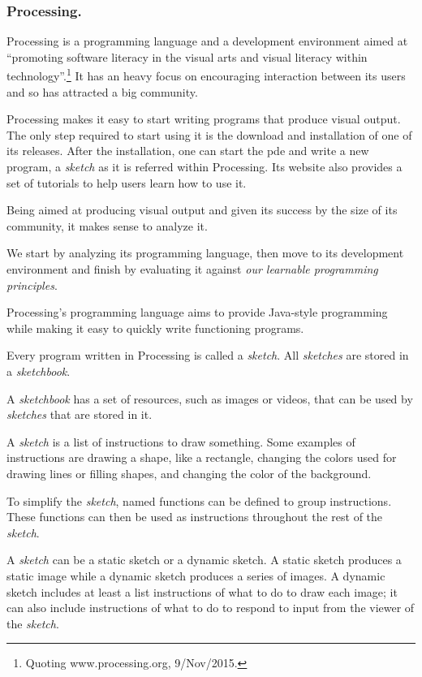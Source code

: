 \documentclass{./llncs2e/llncs}
\begin{document}
\subsubsection{Processing.}
	Processing\cite{reas2007processing} is a programming language and a development environment aimed at ``promoting software literacy in the visual arts and visual literacy within technology''.\footnote{Quoting www.processing.org, 9/Nov/2015.}
	It has an heavy focus on encouraging interaction between its users and so has attracted a big community.
	
	Processing makes it easy to start writing programs that produce visual output. 
	The only step required to start using it is the download and installation of one of its releases. 
	After the installation, one can start the \ac{pde} and write a new program, a \emph{sketch} as it is referred within Processing. 
	Its website also provides a set of tutorials to help users learn how to use it.
	
	Being aimed at producing visual output and given its success by the size of its community, it makes sense to analyze it.
	
	We start by analyzing its programming language, then move to its development environment and finish by evaluating it against \emph{our learnable programming principles}.
	
	Processing's programming language aims to provide Java-style programming while making it easy to quickly write functioning programs. 
	
	Every program written in Processing is called a \emph{sketch}. 
	All \emph{sketches} are stored in a \emph{sketchbook}.
	
	A \emph{sketchbook} has a set of resources, such as images or videos, that can be used by \emph{sketches} that are stored in it.
	
	A \emph{sketch} is a list of instructions to draw something. 
	Some examples of instructions are drawing a shape, like a rectangle, changing the colors used for drawing lines or filling shapes, and changing the color of the background.
	
	To simplify the \emph{sketch}, named functions can be defined to group instructions. 
	These functions can then be used as instructions throughout the rest of the \emph{sketch}.
	
	A \emph{sketch} can be a static sketch or a dynamic sketch. 
	A static sketch produces a static image while a dynamic sketch produces a series of images. 
	A dynamic sketch includes at least a list instructions of what to do to draw each image; it can also include instructions of what to do to respond to input from the viewer of the \emph{sketch}.
	
\end{document}

